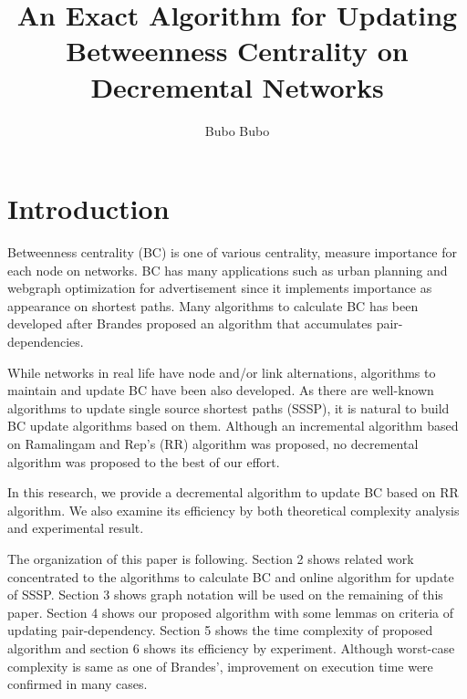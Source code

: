 \documentclass[twocolumn]{article}
\title{An Exact Algorithm for Updating Betweenness Centrality on \\ Decremental Networks}
\author{Bubo Bubo}
\begin{document}
\twocolumn[
  \begin{@twocolumnfalse}
    \maketitle
    \begin{abstract}
    \end{abstract}
  \end{@twocolumnfalse}
]

  \section{Introduction}
  Betweenness centrality (BC)\cite{Freeman1977} is one of various centrality, measure importance for each node on networks.
  BC has many applications such as urban planning\cite{Crucitti2006} and webgraph optimization for advertisement\cite{Medya2018} since it implements importance as appearance on shortest paths.
  Many algorithms to calculate BC has been developed after Brandes\cite{Brandes2001} proposed an algorithm that accumulates pair-dependencies.

  While networks in real life have node and/or link alternations\cite{Holme2012}, algorithms to maintain and update BC have been also developed.
  As there are well-known algorithms to update single source shortest paths (SSSP), it is natural to build BC update algorithms based on them.
  Although an incremental algorithm based on Ramalingam and Rep's (RR) algorithm\cite{Ramalingam1996} was proposed, no decremental algorithm was proposed to the best of our effort.

  In this research, we provide a decremental algorithm to update BC based on RR algorithm.
  We also examine its efficiency by both theoretical complexity analysis and experimental result.

  The organization of this paper is following.
  Section 2 shows related work concentrated to the algorithms to calculate BC and online algorithm for update of SSSP.
  Section 3 shows graph notation will be used on the remaining of this paper.
  Section 4 shows our proposed algorithm with some lemmas on criteria of updating pair-dependency.
  Section 5 shows the time complexity of proposed algorithm and section 6 shows its efficiency by experiment.
  Although worst-case complexity is same as one of Brandes', improvement on execution time were confirmed in many cases.
\end{document}
